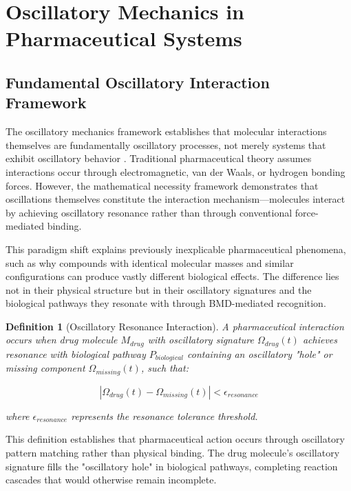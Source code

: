 \documentclass[12pt,a4paper]{article}
\newtheorem{definition}{Definition}[section]
\begin{document}
\section{Oscillatory Mechanics in Pharmaceutical Systems}

\subsection{Fundamental Oscillatory Interaction Framework}

The oscillatory mechanics framework establishes that molecular interactions themselves are fundamentally oscillatory processes, not merely systems that exhibit oscillatory behavior \citep{arnold1978mathematical, goldstein2002classical}. Traditional pharmaceutical theory assumes interactions occur through electromagnetic, van der Waals, or hydrogen bonding forces. However, the mathematical necessity framework demonstrates that oscillations themselves constitute the interaction mechanism—molecules interact by achieving oscillatory resonance rather than through conventional force-mediated binding.

This paradigm shift explains previously inexplicable pharmaceutical phenomena, such as why compounds with identical molecular masses and similar configurations can produce vastly different biological effects. The difference lies not in their physical structure but in their oscillatory signatures and the biological pathways they resonate with through BMD-mediated recognition.

\begin{definition}[Oscillatory Resonance Interaction]
A pharmaceutical interaction occurs when drug molecule $M_{drug}$ with oscillatory signature $\Omega_{drug}(t)$ achieves resonance with biological pathway $P_{biological}$ containing an oscillatory "hole" or missing component $\Omega_{missing}(t)$, such that:

\begin{equation}
|\Omega_{drug}(t) - \Omega_{missing}(t)| < \epsilon_{resonance}
\end{equation}

where $\epsilon_{resonance}$ represents the resonance tolerance threshold.
\end{definition}

This definition establishes that pharmaceutical action occurs through oscillatory pattern matching rather than physical binding. The drug molecule's oscillatory signature fills the "oscillatory hole" in biological pathways, completing reaction cascades that would otherwise remain incomplete.
\end{document}
